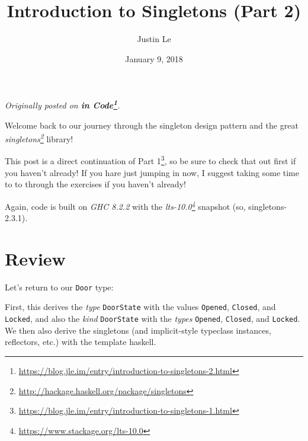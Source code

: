 \documentclass[]{article}
\title{Introduction to Singletons (Part 2)}
\author{Justin Le}
\date{January 9, 2018}
\newenvironment{Shaded}{}{}
\newcommand{\KeywordTok}[1]{\textcolor[rgb]{0.00,0.44,0.13}{\textbf{#1}}}
\newcommand{\DataTypeTok}[1]{\textcolor[rgb]{0.56,0.13,0.00}{#1}}
\newcommand{\CommentTok}[1]{\textcolor[rgb]{0.38,0.63,0.69}{\textit{#1}}}
\newcommand{\OtherTok}[1]{\textcolor[rgb]{0.00,0.44,0.13}{#1}}
\newcommand{\FunctionTok}[1]{\textcolor[rgb]{0.02,0.16,0.49}{#1}}
\newcommand{\NormalTok}[1]{#1}
\renewcommand{\href}[2]{#2\footnote{\url{#1}}}
\begin{document}
\maketitle

\emph{Originally posted on
\textbf{\href{https://blog.jle.im/entry/introduction-to-singletons-2.html}{in
Code}}.}

Welcome back to our journey through the singleton design pattern and the great
\emph{\href{http://hackage.haskell.org/package/singletons}{singletons}} library!

This post is a direct continuation of
\href{https://blog.jle.im/entry/introduction-to-singletons-1.html}{Part 1}, so
be sure to check that out first if you haven't already! If you hare just jumping
in now, I suggest taking some time to to through the exercises if you haven't
already!

Again, code is built on \emph{GHC 8.2.2} with the
\emph{\href{https://www.stackage.org/lts-10.0}{lts-10.0}} snapshot (so,
singletons-2.3.1).

\section{Review}\label{review}

Let's return to our \texttt{Door} type:

\begin{Shaded}
\end{Shaded}

First, this derives the \emph{type} \texttt{DoorState} with the values
\texttt{Opened}, \texttt{Closed}, and \texttt{Locked}, and also the \emph{kind}
\texttt{DoorState} with the \emph{types} \texttt{\textquotesingle{}Opened},
\texttt{\textquotesingle{}Closed}, and \texttt{\textquotesingle{}Locked}. We
then also derive the singletons (and implicit-style typeclass instances,
reflectors, etc.) with the template haskell.
\end{document}
